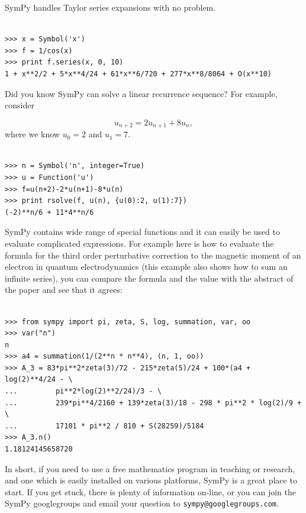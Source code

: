 \documentclass[12pt]{article}
\begin{document}
SymPy handles Taylor series expansions with no problem.

\begin{Verbatim}[fontsize=\scriptsize,fontfamily=courier,fontshape=tt,frame=single,label=SymPy]

>>> x = Symbol('x')
>>> f = 1/cos(x)
>>> print f.series(x, 0, 10)
1 + x**2/2 + 5*x**4/24 + 61*x**6/720 + 277*x**8/8064 + O(x**10)

\end{Verbatim}

Did you know SymPy can solve a linear recurrence sequence?
For example, consider

\[
 u_{n+2} = 2  u_{n+1} + 8  u_{n},
\]
where we know $u_{0} = 2$ and $u_{1} = 7$.

\begin{Verbatim}[fontsize=\scriptsize,fontfamily=courier,fontshape=tt,frame=single,label=SymPy]

>>> n = Symbol('n', integer=True)
>>> u = Function('u')
>>> f=u(n+2)-2*u(n+1)-8*u(n)
>>> print rsolve(f, u(n), {u(0):2, u(1):7})
(-2)**n/6 + 11*4**n/6

\end{Verbatim}

SymPy contains wide range of special functions and it can easily be used to
evaluate complicated expressions. For example here is how to evaluate the
formula for the third order perturbative correction to the
magnetic moment of an electron in quantum electrodynamics (this example also
shows how to sum an infinite series), you can compare the formula and the value
with the abstract of the paper \cite{QED} and see that it agrees:

\begin{Verbatim}[fontsize=\scriptsize,fontfamily=courier,fontshape=tt,frame=single,label=SymPy]

>>> from sympy import pi, zeta, S, log, summation, var, oo
>>> var("n")
n
>>> a4 = summation(1/(2**n * n**4), (n, 1, oo))
>>> A_3 = 83*pi**2*zeta(3)/72 - 215*zeta(5)/24 + 100*(a4 + log(2)**4/24 - \
...         pi**2*log(2)**2/24)/3 - \
...         239*pi**4/2160 + 139*zeta(3)/18 - 298 * pi**2 * log(2)/9 + \
...         17101 * pi**2 / 810 + S(28259)/5184
>>> A_3.n()
1.18124145658720

\end{Verbatim}

\vskip 0.3in

In short, if you need to use a free mathematics program in teaching or
research, and one which is easily installed on various platforms,
SymPy is a great place to start. If you get stuck, there is plenty of
information
on-line, or you can join the SymPy googlegroups and
email your question to {\tt sympy@googlegroups.com}.
\end{document}
